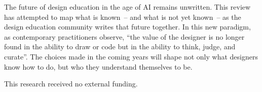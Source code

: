 \documentclass[ed]{acnsart}
\begin{document}
The future of design education in the age of AI remains unwritten. This review has attempted to map what is known~-- and what is not yet known~-- as the design education community writes that future together. In this new paradigm, as contemporary practitioners observe, ``the value of the designer is no longer found in the ability to draw or code but in the ability to think, judge, and curate''. The choices made in the coming years will shape not only what designers know how to do, but who they understand themselves to be.


%

\begin{funding}
	This research received no external funding.
\end{funding}






%

\end{document}
